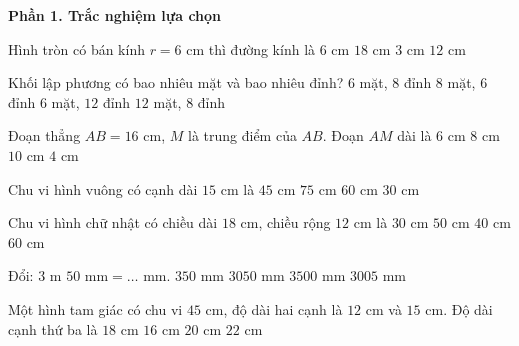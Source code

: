 \textbf{Phần 1. Trắc nghiệm lựa chọn}

\begin{ex} %
Hình tròn có bán kính $r = 6\text{ cm}$ thì đường kính là
\choice
{$6\text{ cm}$}
{$18\text{ cm}$}
{$3\text{ cm}$}
{\True $12\text{ cm}$}
\end{ex}

\begin{ex} %
Khối lập phương có bao nhiêu mặt và bao nhiêu đỉnh?
\choice
{\True $6$ mặt, $8$ đỉnh}
{$8$ mặt, $6$ đỉnh}
{$6$ mặt, $12$ đỉnh}
{$12$ mặt, $8$ đỉnh}
\end{ex}

\begin{ex} %
Đoạn thẳng $AB = 16\text{ cm}$, $M$ là trung điểm của $AB$. Đoạn $AM$ dài là
\choice
{$6\text{ cm}$}
{\True $8\text{ cm}$}
{$10\text{ cm}$}
{$4\text{ cm}$}
\end{ex}

\begin{ex} %
Chu vi hình vuông có cạnh dài $15\text{ cm}$ là
\choice
{$45\text{ cm}$}
{$75\text{ cm}$}
{\True $60\text{ cm}$}
{$30\text{ cm}$}
\end{ex}

\begin{ex} %
Chu vi hình chữ nhật có chiều dài $18\text{ cm}$, chiều rộng $12\text{ cm}$ là
\choice
{$30\text{ cm}$}
{$50\text{ cm}$}
{$40\text{ cm}$}
{\True $60\text{ cm}$}
\end{ex}

\begin{ex} %
Đổi: $3\text{ m } 50\text{ mm} = \dots\text{ mm}$.
\choice
{$350\text{ mm}$}
{\True $3050\text{ mm}$}
{$3500\text{ mm}$}
{$3005\text{ mm}$}
\end{ex}

\begin{ex} %
Một hình tam giác có chu vi $45\text{ cm}$, độ dài hai cạnh là $12\text{ cm}$ và $15\text{ cm}$. Độ dài cạnh thứ ba là
\choice
{\True $18\text{ cm}$}
{$16\text{ cm}$}
{$20\text{ cm}$}
{$22\text{ cm}$}
\end{ex}

